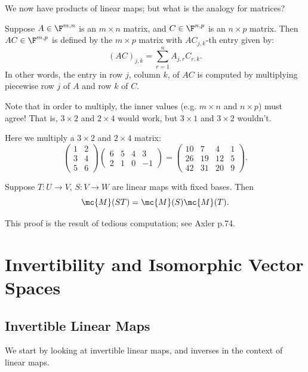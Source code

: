 \documentclass[math0540-lecture-notes.tex]{subfiles}
\begin{document}
We now have products of linear maps; but what is the analogy for matrices?

\begin{definition}{}
  Suppose $A\in \F^{m,n}$ is an $m\times n$ matrix, and $C\in \F^{n,p}$ is an $n\times p$ matrix.
  Then $AC\in \F^{m,p}$ is defined by the $m\times p$ matrix with $AC_{j,k}$-th entry given by:  \[
    (AC)_{j,k}=\sum_{r=1}^{n} A_{j,r}C_{r,k}
  .\] In other words, the entry in row $j$, column $k$, of $AC$ is computed by multiplying piecewise
  row $j$ of $A$ and row $k$ of $C$.
\end{definition}

Note that in order to multiply, the inner values (e.g. $m\times n$ and $n\times p$) must agree! That
is, $3\times 2$ and $2\times 4$ would work, but $3\times 1$ and $3\times 2$ wouldn't.
\begin{example}
  Here we multiply a $3\times 2$ and $2\times 4$ matrix: \[
    \begin{pmatrix} 1&2\\3&4\\5&6 \end{pmatrix} \begin{pmatrix} 6&5&4&3 \\2&1&0&-1\end{pmatrix}
    =\begin{pmatrix} 10&7&4&1\\26&19&12&5\\42&31&20&9 \end{pmatrix}
  .\] 
\end{example} 

\begin{proposition}[]{}
  Suppose $T:U\to V$, $S:V\to W$ are linear maps with fixed bases. Then \[
    \mc{M}(ST)=\mc{M}(S)\mc{M}(T)
  .\] 
\end{proposition}
This proof is the result of tedious computation; see Axler p.74.


\section{Invertibility and Isomorphic Vector Spaces}

\subsection{Invertible Linear Maps}

We start by looking at invertible linear maps, and inverses in the context of linear maps.
\end{document}
